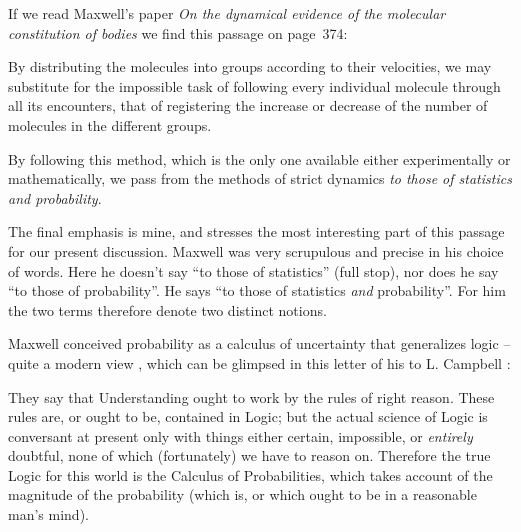 \documentclass[\ifafour a4paper,12pt,\else a5paper,10pt,\fi%
onecolumn,oneside,article,%
british%
]{memoir}
\theoremstyle{remark}
\theoremstyle{innote}
\newcommand*{\citep}{\parencites}
\newcommand*{\citey}{\parencites*}
\renewcommand*{\|}{\nonscript\,\vert\nonscript\;\mathopen{}}
\newcommand*{\chap}{ch.}%
\newcommand*{\cf}{{cf.}}
\newenvironment{myquote}{\medskip\begin{adjustwidth}{\parindent}{\parindent}\small}{\end{adjustwidth}\medskip}
\begin{document}
If we read Maxwell's paper \emph{On the dynamical evidence of the
  molecular constitution of bodies} \citey{maxwell1875} we find this
passage on page~374:
\begin{myquote}
  By distributing the molecules into groups according to their velocities,
  we may substitute for the impossible task of following every individual
  molecule through all its encounters, that of registering the increase or
  decrease of the number of molecules in the different groups.

  By following this method, which is the only one available either
  experimentally or mathematically, we pass from the methods of strict
  dynamics \emph{to those of statistics and probability}.
\end{myquote}
The final emphasis is mine, and stresses the most interesting part of this
passage for our present discussion. Maxwell was very scrupulous and precise
in his choice of words. Here he doesn't say \enquote{to those of
  statistics} (full stop), nor does he say \enquote{to those of
  probability}. He says \enquote{to those of statistics \emph{and}
  probability}. For him the two terms therefore denote two distinct
notions.

Maxwell conceived probability as a calculus of uncertainty that generalizes
logic -- quite a modern view \citep[\cf][]{hailperin1996,hailperin2011},
which can be glimpsed in this letter of his to L. Campbell \citep%
[\chap~V, p.~143]{campbelletal1882}:
\begin{myquote}
  They say that Understanding ought to work by the rules of right reason.
  These rules are, or ought to be, contained in Logic; but the actual
  science of Logic is conversant at present only with things either
  certain, impossible, or \emph{entirely} doubtful, none of which
  (fortunately) we have to reason on. Therefore the true Logic for this
  world is the Calculus of Probabilities, which takes account of the
  magnitude of the probability (which is, or which ought to be in a
  reasonable man's mind).
\end{myquote}
\end{document}
